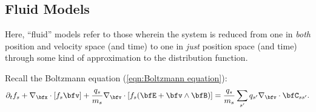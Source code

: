 \subsection{Fluid Models}\label{cha:fluid models}
    \line

    \begin{definition}
        Here, ``fluid'' models refer to those wherein the system is reduced from one in \emph{both} position and velocity space (and time) to one in \emph{just} position space (and time) through some kind of approximation to the distribution function.
    \end{definition}

    \line
    
    Recall the Boltzmann equation (\ref{eqn:Boltzmann equation}):
    \begin{equation*}
        \partial_{t}f_{s} + \nabla_{\bfx}\cdot[f_{s}\bfv] + \frac{q_{s}}{m_{s}}\nabla_{\bfv}\cdot[f_{s}(\bfE + \bfv\wedge\bfB)]  =  \frac{q_{s}}{m_{s}}\sum_{s'}q_{s'}\nabla_{\bfv}\cdot\bfC_{ss'}.
    \end{equation*}


    
    
    
    